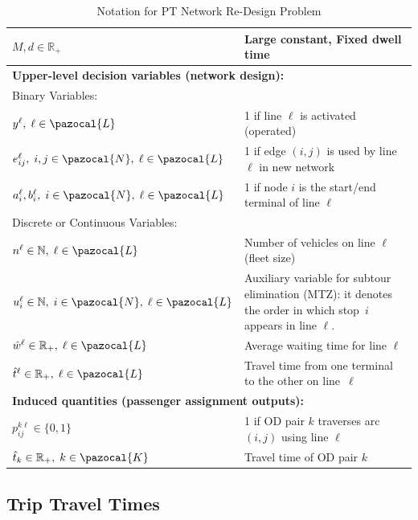 \documentclass[a4paper,fleqn]{cas-sc}
\begin{document}
\begin{table}
\begin{tabular}{p{} p{}}
$M, d \in \mathbb{R}_{+}$ & Large constant, Fixed dwell time \\
\midrule
\multicolumn{2}{l}{\textbf{Upper-level decision variables (network design):}} \\
\midrule
\multicolumn{2}{l}{Binary Variables:} \\
\midrule
$y^\ell,\; \ell \in \pazocal{L}$ & 1 if line $\ell$ is activated (operated) \\
$e_{ij}^\ell,\; i,j \in \pazocal{N},\; \ell \in \pazocal{L}$ & 1 if edge $(i,j)$ is used by line $\ell$ in new network \\
$a_i^\ell, b_i^\ell,\; i \in \pazocal{N},\; \ell \in \pazocal{L}$ & 1 if node $i$ is the start/end terminal of line $\ell$ \\
\midrule
\multicolumn{2}{l}{Discrete or Continuous Variables:} \\
\midrule
$n^\ell \in \mathbb{N},\; \ell \in \pazocal{L}$ & Number of vehicles on line $\ell$ (fleet size) 
\\

$u_i^\ell \in \mathbb{N},\; i \in \pazocal{N},\; \ell \in \pazocal{L}$ 
& Auxiliary variable for subtour elimination (MTZ): it denotes the order in which stop~$i$ appears in line $\ell$.
\\
$\hat{w}^\ell \in \mathbb{R}_{+},\; \ell \in \pazocal{L}$ & Average waiting time for line $\ell$ \\
$\hat{t}^\ell \in \mathbb{R}_{+},\; \ell \in \pazocal{L}$ & Travel time from one terminal to the other on line~$\ell$ \\
\midrule
\multicolumn{2}{l}{\textbf{Induced quantities (passenger assignment outputs):}} \\
\midrule
$p_{ij}^{k\ell} \in \{0,1\}$ & 1 if OD pair $k$ traverses arc $(i,j)$ using line $\ell$ \\
$\hat{t}_k \in \mathbb{R}_{+},\; k \in \pazocal{K}$ & Travel time of OD pair $k$ \\
\bottomrule
\end{tabular}
\caption{Notation for PT Network Re-Design Problem}
\label{tab:notation}
\end{table}

\subsection{Trip Travel Times}
\label{sec:trip-travel-times}
\end{document}
